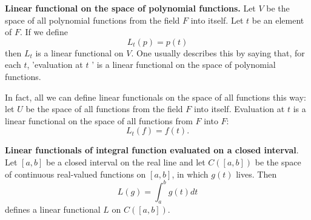 \documentclass[main.tex]{subfiles}
\begin{document}
\begin{example}
\textbf{Linear functional on the space of polynomial functions.} Let $V$ be the space of all polynomial functions from the field $F$ into itself. Let $t$ be an element of $F$. If we define
$$
L_t(p)=p(t)
$$
then $L_t$ is a linear functional on $V$. One usually describes this by saying that, for each $t$, 'evaluation at $t$ ' is a linear functional on the space of polynomial functions. 

In fact, all we can define linear functionals on the space of all functions this way: let $U$ be the space of all functions from the field $F$ into itself. Evaluation at $t$ is a linear functional on the space of all functions from $F$ into $F$:
$$
L_t(f)=f(t).
$$
\end{example}


\begin{example}
\textbf{Linear functionals of integral function evaluated on a closed interval}. Let $[a, b]$ be a closed interval on the real line and let $C([a, b])$ be the space of continuous real-valued functions on $[a, b]$, in which $g(t)$ lives. Then
$$
L(g)=\int_a^b g(t) d t
$$
defines a linear functional $L$ on $C([a, b])$.
\end{example}
\end{document}
